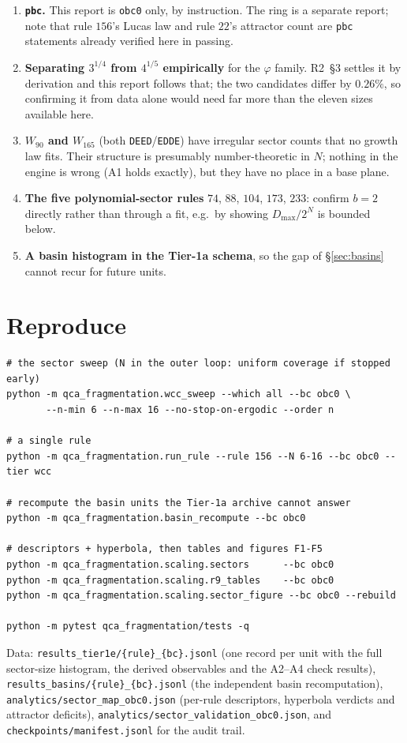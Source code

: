 \documentclass[11pt]{article}
\newcommand{\rt}[1]{\texttt{#1}}
\newcommand{\fn}[1]{\texttt{#1}}
\theoremstyle{plain}
\theoremstyle{definition}
\begin{document}
\begin{enumerate}
\item \textbf{\rt{pbc}.} This report is \rt{obc0} only, by instruction. The ring
  is a separate report; note that rule $156$'s Lucas law and rule $22$'s
  attractor count are \rt{pbc} statements already verified here in passing.
\item \textbf{Separating $3^{1/4}$ from $4^{1/5}$ empirically} for the $\varphi$
  family. R2~\S3 settles it by derivation and this report follows that; the two
  candidates differ by $0.26\%$, so confirming it from data alone would need far
  more than the eleven sizes available here.
\item \textbf{$W_{90}$ and $W_{165}$} (both \rt{DEED}/\rt{EDDE}) have irregular
  sector counts that no growth law fits. Their structure is presumably
  number-theoretic in $N$; nothing in the engine is wrong (A1 holds exactly), but
  they have no place in a base plane.
\item \textbf{The five polynomial-sector rules} $74$, $88$, $104$, $173$, $233$:
  confirm $b=2$ directly rather than through a fit, e.g.\ by showing
  $D_{\max}/2^N$ is bounded below.
\item \textbf{A basin histogram in the Tier-1a schema}, so the gap of
  \S\ref{sec:basins} cannot recur for future units.
\end{enumerate}

\section{Reproduce}

\begin{verbatim}
# the sector sweep (N in the outer loop: uniform coverage if stopped early)
python -m qca_fragmentation.wcc_sweep --which all --bc obc0 \
       --n-min 6 --n-max 16 --no-stop-on-ergodic --order n

# a single rule
python -m qca_fragmentation.run_rule --rule 156 --N 6-16 --bc obc0 --tier wcc

# recompute the basin units the Tier-1a archive cannot answer
python -m qca_fragmentation.basin_recompute --bc obc0

# descriptors + hyperbola, then tables and figures F1-F5
python -m qca_fragmentation.scaling.sectors      --bc obc0
python -m qca_fragmentation.scaling.r9_tables    --bc obc0
python -m qca_fragmentation.scaling.sector_figure --bc obc0 --rebuild

python -m pytest qca_fragmentation/tests -q
\end{verbatim}

\begin{sloppypar}
Data: \fn{results\_tier1e/\{rule\}\_\{bc\}.jsonl} (one record per unit with the
full sector-size histogram, the derived observables and the A2--A4 check
results), \fn{results\_basins/\{rule\}\_\{bc\}.jsonl} (the independent basin
recomputation), \fn{analytics/sector\_map\_obc0.json} (per-rule descriptors,
hyperbola verdicts and attractor deficits),
\fn{analytics/sector\_validation\_obc0.json}, and
\fn{checkpoints/manifest.jsonl} for the audit trail.
\end{sloppypar}
\end{document}
